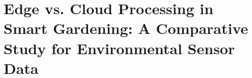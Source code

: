 \chapter[Edge vs. Cloud Processing in Smart Gardening]{ Edge vs. Cloud Processing in Smart Gardening: A Comparative Study for Environmental Sensor Data}








